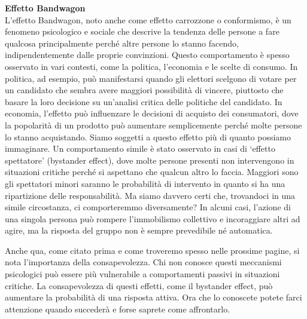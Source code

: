\documentclass[12pt]{book} %
\begin{document}
\noindent \textbf{\large Effetto Bandwagon} \\
L'effetto Bandwagon, noto anche come effetto carrozzone o conformismo, è un fenomeno psicologico e
sociale che descrive la tendenza delle persone a fare qualcosa principalmente perché altre persone lo stanno facendo,
indipendentemente dalle proprie convinzioni. Questo comportamento è spesso osservato in vari contesti, come la
politica, l'economia e le scelte di consumo. In politica, ad esempio, può manifestarsi quando gli
elettori scelgono di votare per un candidato che sembra avere maggiori possibilità di vincere, piuttosto che basare la
loro decisione su un'analisi critica delle politiche del candidato. In economia,
l'effetto può influenzare le decisioni di acquisto dei consumatori, dove la popolarità di un
prodotto può aumentare semplicemente perché molte persone lo stanno acquistando. Siamo soggetti a questo effetto più di quanto possiamo immaginare. Un comportamento simile è stato osservato in casi di ‘effetto spettatore’ (bystander effect), dove molte persone presenti non intervengono in situazioni critiche perché si aspettano che qualcun altro lo faccia. Maggiori sono gli spettatori minori saranno le
probabilità di intervento in quanto si ha una ripartizione delle responsabilità. Ma siamo davvero certi che, trovandoci in una simile circostanza, ci comporteremmo diversamente? In alcuni casi, l’azione di una singola persona può rompere l’immobilismo collettivo e incoraggiare altri ad agire, ma la risposta del gruppo non è sempre prevedibile né automatica.

Anche qua, come citato prima e come troveremo spesso nelle prossime pagine, si nota l'importanza
della consapevolezza. Chi non conosce questi meccanismi psicologici può essere più vulnerabile a comportamenti passivi in situazioni critiche. La consapevolezza di questi effetti, come il bystander effect, può aumentare la probabilità di una risposta attiva. Ora che lo
conoscete potete farci attenzione quando succederà e forse saprete come affrontarlo. 
\end{document}
